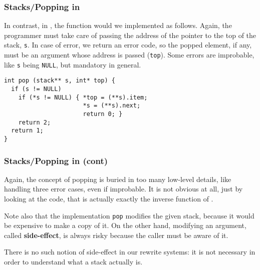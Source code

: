 %
\begin{frame}[containsverbatim]
\frametitle{Stacks/Popping in \C}

In contrast, in \C, the  function would we implemented as
follows. Again, the programmer must take care of passing the address
of the pointer to the top of the stack, \verb|s|. In case of error, we
return an error code, so the popped element, if any, must be an
argument whose address is passed (\verb|top|). Some errors are
improbable, like \verb|s| being \verb|NULL|, but mandatory in
general.
{\small
\begin{verbatim}
int pop (stack** s, int* top) {
  if (s != NULL)
    if (*s != NULL) { *top = (**s).item;
                      *s = (**s).next;
                      return 0; }
    return 2;
  return 1;
}
\end{verbatim}
}

\end{frame}

%
\begin{frame}[containsverbatim]
\frametitle{Stacks/Popping in \C (cont)}

Again, the concept of popping is buried in too many low-level details,
like handling three error cases, even if improbable. It is not obvious
at all, just by looking at the code, that  is actually
exactly the inverse function of .

\bigskip

Note also that the \C implementation \verb|pop| modifies the given
stack, because it would be expensive to make a copy of it. On the
other hand, modifying an argument, called \textbf{side-effect}, is
always risky because the caller must be aware of it.

\bigskip

There is no such notion of side-effect in our rewrite systems: it is
not necessary in order to understand what a stack actually is.

\end{frame}

